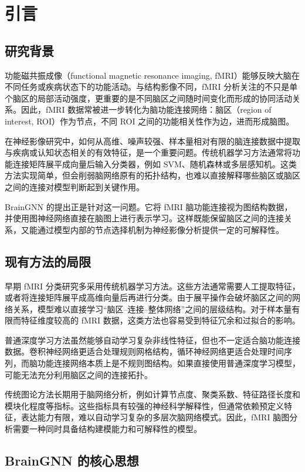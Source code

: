 \chapter{引言}

\section{研究背景}

功能磁共振成像（functional magnetic resonance imaging, fMRI）能够反映大脑在不同任务或疾病状态下的功能活动。与结构影像不同，fMRI 分析关注的不只是单个脑区的局部活动强度，更重要的是不同脑区之间随时间变化而形成的协同活动关系。因此，fMRI 数据常被进一步转化为脑功能连接网络：脑区（region of interest, ROI）作为节点，不同 ROI 之间的功能相关性作为边，进而形成脑图。

在神经影像研究中，如何从高维、噪声较强、样本量相对有限的脑连接数据中提取与疾病或认知状态相关的有效特征，是一个重要问题。传统机器学习方法通常将功能连接矩阵展平成向量后输入分类器，例如 SVM、随机森林或多层感知机。这类方法实现简单，但会削弱脑网络原有的拓扑结构，也难以直接解释哪些脑区或脑区之间的连接对模型判断起到关键作用。

BrainGNN 的提出正是针对这一问题。它将 fMRI 脑功能连接视为图结构数据，并使用图神经网络直接在脑图上进行表示学习。这样既能保留脑区之间的连接关系，又能通过模型内部的节点选择机制为神经影像分析提供一定的可解释性。

\section{现有方法的局限}

早期 fMRI 分类研究多采用传统机器学习方法。这些方法通常需要人工提取特征，或者将连接矩阵展平成高维向量后再进行分类。由于展平操作会破坏脑区之间的网络关系，模型难以直接学习“脑区--连接--整体网络”之间的层级结构。对于样本量有限而特征维度较高的 fMRI 数据，这类方法也容易受到特征冗余和过拟合的影响。

普通深度学习方法虽然能够自动学习复杂非线性特征，但也不一定适合脑功能连接数据。卷积神经网络更适合处理规则网格结构，循环神经网络更适合处理时间序列，而脑功能连接网络本质上是不规则图结构。如果直接使用普通深度学习模型，可能无法充分利用脑区之间的连接拓扑。

传统图论方法长期用于脑网络分析，例如计算节点度、聚类系数、特征路径长度和模块化程度等指标。这些指标具有较强的神经科学解释性，但通常依赖预定义特征，表达能力有限，难以自动学习复杂的多层次脑网络模式。因此，fMRI 脑图分析需要一种同时具备结构建模能力和可解释性的模型。

\section{BrainGNN 的核心思想}

